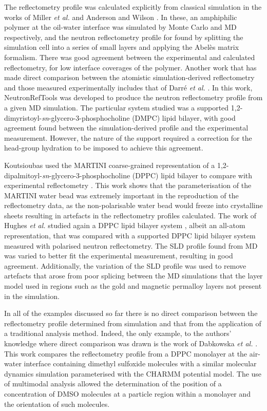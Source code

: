 \documentclass[amsmath,amssymb,twocolumn,superscriptaddress]{revtex4-1}
\begin{document}
The reflectometry profile was calculated explicitly from classical
simulation in the works of Miller \emph{et al.} and Anderson and
Wilson \cite{Miller2003,Anderson2004}.
In these, an amphiphilic polymer at the oil-water interface was simulated by
Monte Carlo and MD respectively, and the neutron reflectometry profile for
found by splitting the simulation cell into a series of small layers and
applying the Abel\`{e}s matrix formalism.
There was good agreement between the experimental and calculated
reflectometry, for low interface coverages of the polymer.
Another work that has made direct comparison between the atomistic
simulation-derived reflectometry and those measured experimentally includes
that of Darr\'{e} \emph{et al.} \cite{Darre2015}.
In this work, NeutronRefTools was developed to produce the neutron
reflectometry profile from a given MD simulation.
The particular system studied was a supported
1,2-dimyristoyl-\emph{sn}-glycero-3-phosphocholine (DMPC) lipid bilayer,
with good agreement found between the simulation-derived profile and the
experimental measurement.
However, the nature of the support required a correction for the head-group
hydration to be imposed to achieve this agreement.

Koutsioubas used the MARTINI coarse-grained representation of a
1,2-dipalmitoyl-\emph{sn}-glycero-3-phosphocholine (DPPC) lipid bilayer to
compare with experimental reflectometry \cite{Koutsioubas2016}.
This work shows that the parameterisation of the MARTINI water bead was
extremely important in the reproduction of the reflectometry data, as the
non-polarisable water bead would freeze into crystalline sheets resulting
in artefacts in the reflectometry profiles calculated.
The work of Hughes \emph{et al.} studied again a DPPC lipid bilayer
system \cite{Hughes2016}, albeit an all-atom representation, that was
compared with a supported DPPC lipid bilayer system measured with
polarised neutron reflectometry.
The SLD profile found from MD was varied to better fit the experimental
measurement, resulting in good agreement.
Additionally, the variation of the SLD profile was used to remove
artefacts that arose from poor splicing between the MD simulations that the
layer model used in regions such as the gold and magnetic permalloy layers
not present in the simulation.

In all of the examples discussed so far there is no direct comparison
between the reflectometry profile determined from simulation and that from
the application of a traditional analysis method.
Indeed, the only example, to the authors' knowledge where direct comparison
was drawn is the work of Dabkowska \emph{et al.} \cite{Dabkowska2014}.
This work compares the reflectometry profile from a DPPC monolayer at the
air-water interface containing dimethyl sulfoxide molecules with a similar
molecular dynamics simulation parameterised with the CHARMM potential model.
The use of multimodal analysis allowed the determination of the position of
a concentration of DMSO molecules at a particle region within a monolayer
and the orientation of such molecules.
\end{document}
